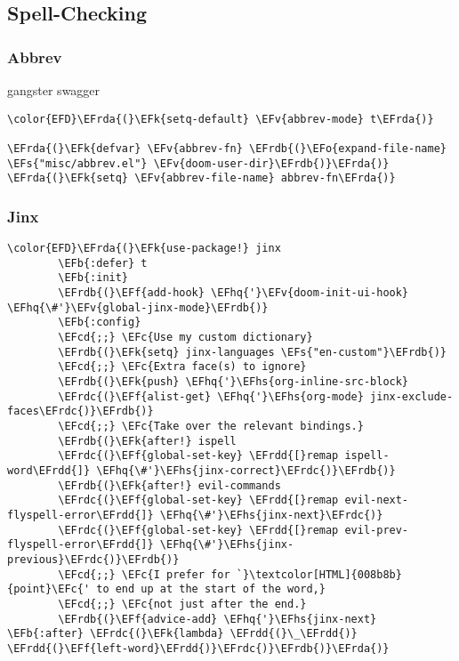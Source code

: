 \documentclass{article}
\newcommand{\EFc}[1]{\textcolor{EFc}{#1}} %
\newcommand{\EFcd}[1]{\textcolor{EFcd}{#1}} %
\newcommand{\EFs}[1]{\textcolor{EFs}{#1}} %
\newcommand{\EFk}[1]{\textcolor{EFk}{#1}} %
\newcommand{\EFb}[1]{\textcolor{EFb}{#1}} %
\newcommand{\EFf}[1]{\textcolor{EFf}{#1}} %
\newcommand{\EFv}[1]{\textcolor{EFv}{#1}} %
\newcommand{\EFo}[1]{\textcolor{EFo}{#1}} %
\newcommand{\EFhq}[1]{#1} %
\newcommand{\EFhs}[1]{\textcolor{EFhs}{#1}} %
\newcommand{\EFrda}[1]{\textcolor{EFrda}{#1}} %
\newcommand{\EFrdb}[1]{\textcolor{EFrdb}{#1}} %
\newcommand{\EFrdc}[1]{\textcolor{EFrdc}{#1}} %
\newcommand{\EFrdd}[1]{\textcolor{EFrdd}{#1}} %
\begin{document}
\subsection{Spell-Checking}
\label{sec:org9f4dc38}
\subsubsection{Abbrev}
\label{sec:org00bff2c}
gangster swagger
\begin{Code}
\begin{Verbatim}
\color{EFD}\EFrda{(}\EFk{setq-default} \EFv{abbrev-mode} t\EFrda{)}

\EFrda{(}\EFk{defvar} \EFv{abbrev-fn} \EFrdb{(}\EFo{expand-file-name} \EFs{"misc/abbrev.el"} \EFv{doom-user-dir}\EFrdb{)}\EFrda{)}
\EFrda{(}\EFk{setq} \EFv{abbrev-file-name} abbrev-fn\EFrda{)}
\end{Verbatim}
\end{Code}

\subsubsection{Jinx}
\label{sec:orge3d3b27}
\begin{Code}
\begin{Verbatim}
\color{EFD}\EFrda{(}\EFk{use-package!} jinx
        \EFb{:defer} t
        \EFb{:init}
        \EFrdb{(}\EFf{add-hook} \EFhq{'}\EFv{doom-init-ui-hook} \EFhq{\#'}\EFv{global-jinx-mode}\EFrdb{)}
        \EFb{:config}
        \EFcd{;;} \EFc{Use my custom dictionary}
        \EFrdb{(}\EFk{setq} jinx-languages \EFs{"en-custom"}\EFrdb{)}
        \EFcd{;;} \EFc{Extra face(s) to ignore}
        \EFrdb{(}\EFk{push} \EFhq{'}\EFhs{org-inline-src-block}
        \EFrdc{(}\EFf{alist-get} \EFhq{'}\EFhs{org-mode} jinx-exclude-faces\EFrdc{)}\EFrdb{)}
        \EFcd{;;} \EFc{Take over the relevant bindings.}
        \EFrdb{(}\EFk{after!} ispell
        \EFrdc{(}\EFf{global-set-key} \EFrdd{[}remap ispell-word\EFrdd{]} \EFhq{\#'}\EFhs{jinx-correct}\EFrdc{)}\EFrdb{)}
        \EFrdb{(}\EFk{after!} evil-commands
        \EFrdc{(}\EFf{global-set-key} \EFrdd{[}remap evil-next-flyspell-error\EFrdd{]} \EFhq{\#'}\EFhs{jinx-next}\EFrdc{)}
        \EFrdc{(}\EFf{global-set-key} \EFrdd{[}remap evil-prev-flyspell-error\EFrdd{]} \EFhq{\#'}\EFhs{jinx-previous}\EFrdc{)}\EFrdb{)}
        \EFcd{;;} \EFc{I prefer for `}\textcolor[HTML]{008b8b}{point}\EFc{' to end up at the start of the word,}
        \EFcd{;;} \EFc{not just after the end.}
        \EFrdb{(}\EFf{advice-add} \EFhq{'}\EFhs{jinx-next} \EFb{:after} \EFrdc{(}\EFk{lambda} \EFrdd{(}\_\EFrdd{)} \EFrdd{(}\EFf{left-word}\EFrdd{)}\EFrdc{)}\EFrdb{)}\EFrda{)}
\end{Verbatim}
\end{Code}
\end{document}
